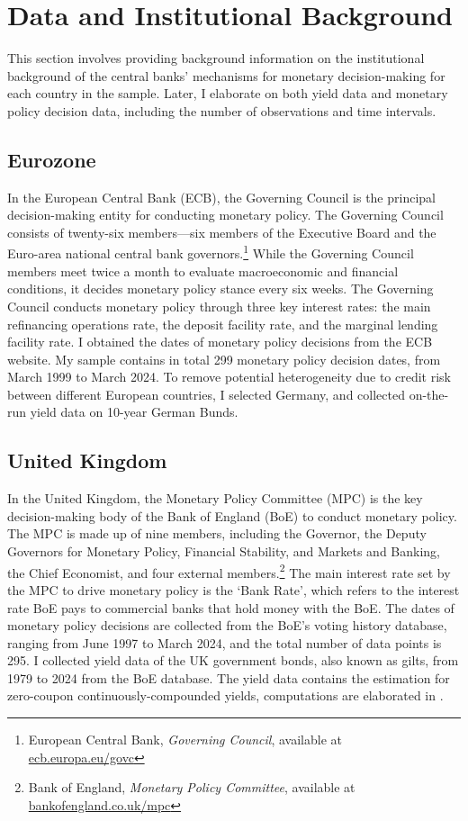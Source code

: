 \section{Data and Institutional Background}

This section involves providing background information on the institutional background of the central banks' mechanisms for monetary decision-making for each country in the sample. Later, I elaborate on both yield data and monetary policy decision data, including the number of observations and time intervals.

\subsection{Eurozone}

In the European Central Bank (ECB), the Governing Council is the principal decision-making entity for conducting monetary policy. The Governing Council consists of twenty-six members---six members of the Executive Board and the Euro-area national central bank governors.\footnote{European Central Bank, \textit{Governing Council}, available at \href{https://www.ecb.europa.eu/ecb/decisions/govc/html/index.en.html}{ecb.europa.eu/govc}} While the Governing Council members meet twice a month to evaluate macroeconomic and financial conditions, it decides monetary policy stance every six weeks. The Governing Council conducts monetary policy through three key interest rates: the main refinancing operations rate, the deposit facility rate, and the marginal lending facility rate. I obtained the dates of monetary policy decisions from the ECB website. My sample contains in total 299 monetary policy decision dates, from March 1999 to March 2024. To remove potential heterogeneity due to credit risk between different European countries, I selected Germany, and collected on-the-run yield data on 10-year German Bunds.

\subsection{United Kingdom}

In the United Kingdom, the Monetary Policy Committee (MPC) is the key decision-making body of the Bank of England (BoE) to conduct monetary policy. The MPC is made up of nine members, including the Governor, the Deputy Governors for Monetary Policy, Financial Stability, and Markets and Banking, the Chief Economist, and four external members.\footnote{Bank of England, \textit{Monetary Policy Committee}, available at \href{https://www.bankofengland.co.uk/about/people/monetary-policy-committee}{bankofengland.co.uk/mpc}} The main interest rate set by the MPC to drive monetary policy is the `Bank Rate', which refers to the interest rate BoE pays to commercial banks that hold money with the BoE. The dates of monetary policy decisions are collected from the BoE's voting history database, ranging from June 1997 to March 2024, and the total number of data points is 295. I collected yield data of the UK government bonds, also known as gilts, from 1979 to 2024 from the BoE database. The yield data contains the estimation for zero-coupon continuously-compounded yields, computations are elaborated in \citet{anderson2001new}.

